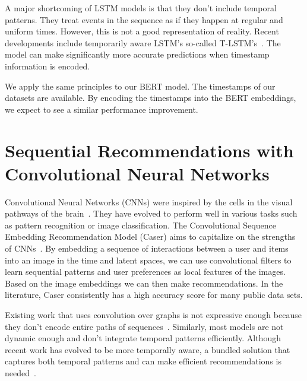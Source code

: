 A major shortcoming of LSTM models is that they don't include temporal patterns. They treat events in the sequence as if they happen at regular and uniform times. However, this is not a good representation of reality. Recent developments include temporarily aware LSTM's so-called T-LSTM's~\cite{mou2019t}. The model can make significantly more accurate predictions when timestamp information is encoded. 

We apply the same principles to our BERT model. The timestamps of our datasets are available. By encoding the timestamps into the BERT embeddings, we expect to see a similar performance improvement. 


\section{Sequential Recommendations with Convolutional Neural Networks}
Convolutional Neural Networks (CNNs) were inspired by the cells in the visual pathways of the brain~\cite{hubel1968receptive}. They have evolved to perform well in various tasks such as pattern recognition or image classification. The Convolutional Sequence Embedding Recommendation Model (Caser) aims to capitalize on the strengths of CNNs~\cite{tang2018personalized}. By embedding a sequence of interactions between a user and items into an image in the time and latent spaces, we can use convolutional filters to learn sequential patterns and user preferences as local features of the images. Based on the image embeddings we can then make recommendations. In the literature, Caser consistently has a high accuracy score for many public data sets.

Existing work that uses convolution over graphs is not expressive enough because they don't encode entire paths of sequences~\cite{hamilton2017inductive,hu2020heterogeneous}. Similarly, most models are not dynamic enough and don't integrate temporal patterns efficiently. Although recent work has evolved to be more temporally aware, a bundled solution that captures both temporal patterns and can make efficient recommendations is needed~\cite{fan2021heterogeneous}.



